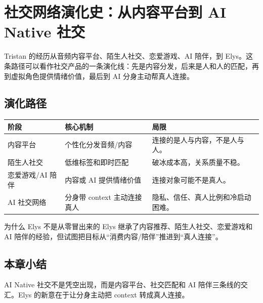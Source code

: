 \section{社交网络演化史：从内容平台到 AI Native 社交}

Tristan 的经历从音频内容平台、陌生人社交、恋爱游戏、AI 陪伴，到 Elys。这条路径可以看作社交产品的一条演化线：先是内容分发，后来是人和人的匹配，再到虚拟角色提供情绪价值，最后到 AI 分身主动帮真人连接。

\subsection{演化路径}

\noindent\begin{longtable}{p{}p{}p{}}
\toprule
阶段 & 核心机制 & 局限 \\
\midrule
内容平台 & 个性化分发音频/内容 & 连接的是人与内容，不是人与人。 \\
陌生人社交 & 低维标签和即时匹配 & 破冰成本高，关系质量不稳。 \\
恋爱游戏/AI 陪伴 & 内容或 AI 提供情绪价值 & 连接对象可能不是真人。 \\
AI 社交网络 & 分身带 context 主动连接真人 & 隐私、信任、真人比例和冷启动困难。 \\
\bottomrule
\end{longtable}

\begin{knowledgebox}{为什么 Elys 不是从零冒出来的}
Elys 继承了内容推荐、陌生人社交、恋爱游戏和 AI 陪伴的经验，但试图把目标从“消费内容/陪伴”推进到“真人连接”。
\end{knowledgebox}

\subsection{本章小结}

AI Native 社交不是凭空出现，而是内容平台、社交匹配和 AI 陪伴三条线的交汇。Elys 的新意在于让分身主动把 context 转成真人连接。

